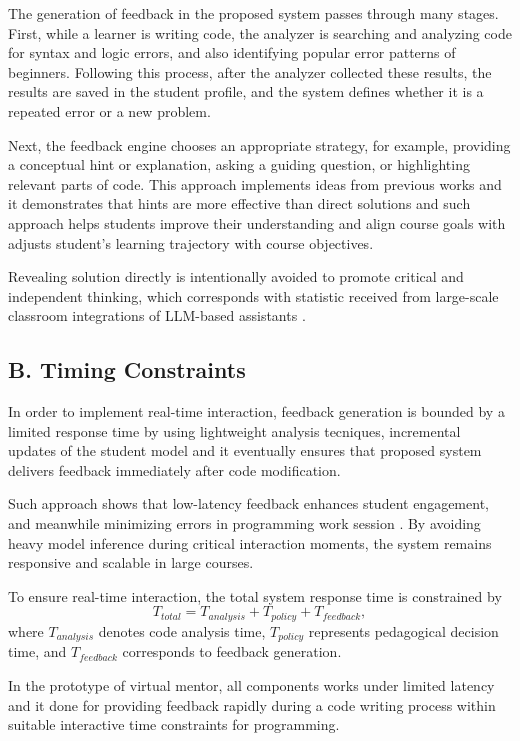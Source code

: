 \documentclass[conference]{IEEEtran}
\begin{document}
The generation of feedback in the proposed system passes through many stages. First, while a learner is writing code, the analyzer is searching and analyzing code for syntax and logic errors, and also identifying popular error patterns of beginners. Following this process, after the analyzer collected these results, the results are saved in the student profile, and the system defines whether it is a repeated error or a new problem. 

Next, the feedback engine chooses an appropriate strategy, for example, providing a conceptual hint or explanation, asking a guiding question, or highlighting relevant parts of code. This approach implements ideas from previous works and it demonstrates that hints are more effective than direct solutions and such approach helps students improve their understanding and align course goals with adjusts student’s learning trajectory with course objectives\cite{IRIS,DesirableCharacteristicsforAITeachingAssistantsinProgrammingEducation}.

Revealing solution directly is intentionally avoided to promote critical and independent thinking, which corresponds with statistic received from large-scale classroom integrations of LLM-based assistants \cite{CodeAid}.


\subsection*{B. Timing Constraints}

In order to implement real-time interaction, feedback generation is bounded by a limited response time by using lightweight analysis tecniques, incremental updates of the student model and it eventually ensures that proposed system delivers feedback immediately after code modification. 


Such approach shows that low-latency feedback enhances student engagement, and meanwhile minimizing errors in programming work session \cite{SystematicLiteratureReviewonLLM,ProgTutor}. By avoiding heavy model inference during critical interaction moments, the system remains responsive and scalable in large courses.

To ensure real-time interaction, the total system response time is constrained by
\[
T_{total} = T_{analysis} + T_{policy} + T_{feedback},
\]
where $T_{analysis}$ denotes code analysis time, $T_{policy}$ represents pedagogical decision time, and $T_{feedback}$ corresponds to feedback generation.

In the prototype of virtual mentor, all components works under limited latency and it done for providing feedback rapidly during a code writing process within suitable interactive time constraints for programming. 
\end{document}
